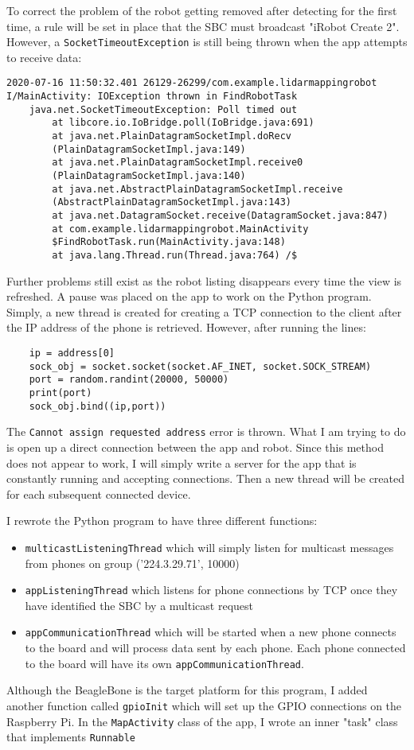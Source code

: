 \documentclass[fontsize=11pt, %
                             paper=a4, %
                             twoside, %
                             captions=tableheading,
                             index=totoc,
                             hyperref]{labbook}
\begin{document}
\begin{addmargin}[0cm]{0cm}
To correct the problem of the robot getting removed after detecting for the first time, a rule will be set in place that the SBC must broadcast "iRobot Create 2". However, a \texttt{SocketTimeoutException} is still being thrown when the app attempts to receive data:
\begin{Verbatim}
2020-07-16 11:50:32.401 26129-26299/com.example.lidarmappingrobot 
I/MainActivity: IOException thrown in FindRobotTask
    java.net.SocketTimeoutException: Poll timed out
        at libcore.io.IoBridge.poll(IoBridge.java:691)
        at java.net.PlainDatagramSocketImpl.doRecv
        (PlainDatagramSocketImpl.java:149)
        at java.net.PlainDatagramSocketImpl.receive0
        (PlainDatagramSocketImpl.java:140)
        at java.net.AbstractPlainDatagramSocketImpl.receive
        (AbstractPlainDatagramSocketImpl.java:143)
        at java.net.DatagramSocket.receive(DatagramSocket.java:847)
        at com.example.lidarmappingrobot.MainActivity
        $FindRobotTask.run(MainActivity.java:148)
        at java.lang.Thread.run(Thread.java:764) /$
\end{Verbatim}
Further problems still exist as the robot listing disappears every time the view is refreshed. 
\medbreak\noindent
A pause was placed on the app to work on the Python program. Simply, a new thread is created for creating a TCP connection to the client after the IP address of the phone is retrieved. However, after running the lines:
\begin{Verbatim}
	ip = address[0]
	sock_obj = socket.socket(socket.AF_INET, socket.SOCK_STREAM)
	port = random.randint(20000, 50000)
	print(port)
	sock_obj.bind((ip,port))	
\end{Verbatim}
The \texttt{Cannot assign requested address} error is thrown. What I am trying to do is open up a direct connection between the app and robot. Since this method does not appear to work, I will simply write a server for the app that is constantly running and accepting connections. Then a new thread will be created for each subsequent connected device.

I rewrote the Python program to have three different functions:
\begin{itemize}
\item \texttt{multicastListeningThread} which will simply listen for multicast messages from phones on group ('224.3.29.71', 10000)
\item \texttt{appListeningThread} which listens for phone connections by TCP once they have identified the SBC by a multicast request
\item \texttt{appCommunicationThread} which will be started when a new phone connects to the board and will process data sent by each phone. Each phone connected to the board will have its own \texttt{appCommunicationThread}.
\end{itemize}
Although the BeagleBone is the target platform for this program, I added another function called \texttt{gpioInit} which will set up the GPIO connections on the Raspberry Pi. 
\medbreak\noindent
In the \texttt{MapActivity} class of the app, I wrote an inner "task" class that implements \texttt{Runnable}


\end{addmargin}
\end{document}

